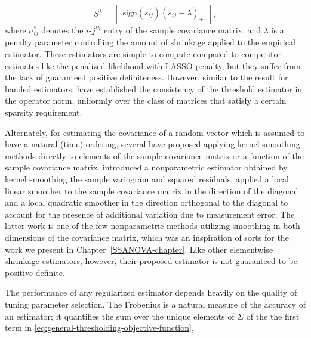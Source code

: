 \[
S^{\lambda}=   \begin{bmatrix} \mbox{sign}\left(s_{ij}\right) \left(s_{ij} - \lambda\right)_+ \end{bmatrix},
\]
\noindent 
where $\sigma^*_{ij}$ denotes the $i$-$j^{th}$ entry of the sample covariance matrix, and $\lambda$ is a penalty parameter controlling the amount of shrinkage applied to the empirical estimator. These estimators are simple to compute compared to competitor estimates like the penalized likelihood with LASSO penalty, but they suffer from the lack of guaranteed positive definiteness. However, similar to the result for banded estimators, \cite{bickel2008covariance} have established the consistency of the threshold estimator in the operator norm, uniformly over the class of matrices that satisfy a certain sparsity requirement. 


\bigskip

Alternately, for estimating the covariance of a random vector which is assumed to have a natural (time) ordering, several have proposed applying kernel smoothing methods directly to elements of the sample covariance matrix or a function of the sample covariance matrix. \cite{zeger1994semiparametric} introduced a nonparametric estimator obtained by kernel smoothing the sample variogram and squared residuals.  \cite{yao2005functional} applied a local linear smoother to the sample covariance matrix in the direction of the diagonal and a local quadratic smoother in the direction orthogonal to the diagonal to account for the presence of additional variation due to measurement error. The latter work is one of the few nonparametric methods utilizing smoothing in both dimensions of the covariance matrix, which was an inspiration of sorts for the work we present in Chapter~\ref{SSANOVA-chapter}. Like other elementwise shrinkage estimators, however, their proposed estimator is not guaranteed to be positive definite. 

\bigskip

The performance of any regularized estimator depends heavily on the quality of tuning parameter selection. The Frobenius is a natural measure of the accuracy of an estimator; it quantifies the sum over the unique elements of $\Sigma$ of the the first term in \ref{eq:general-thresholding-objective-function}, 

